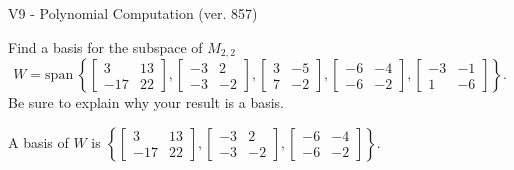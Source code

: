 \begin{exercise}
  \begin{exerciseTitle}V9 - Polynomial Computation (ver. 857)\end{exerciseTitle}
  \begin{exerciseStatement}
    Find a basis for the subspace of \(M_{2,2}\) 
\[W=\mathrm{span}\ \left\{\left[\begin{array}{cc}
3 & 13 \\
-17 & 22
\end{array}\right] , \left[\begin{array}{cc}
-3 & 2 \\
-3 & -2
\end{array}\right] , \left[\begin{array}{cc}
3 & -5 \\
7 & -2
\end{array}\right] , \left[\begin{array}{cc}
-6 & -4 \\
-6 & -2
\end{array}\right] , \left[\begin{array}{cc}
-3 & -1 \\
1 & -6
\end{array}\right]\right\}.\]
 Be sure to explain why your result is a basis.


  \end{exerciseStatement}
  \begin{exerciseAnswer}
   A basis of \(W\) is  \(\left\{\left[\begin{array}{cc}
3 & 13 \\
-17 & 22
\end{array}\right] , \left[\begin{array}{cc}
-3 & 2 \\
-3 & -2
\end{array}\right] , \left[\begin{array}{cc}
-6 & -4 \\
-6 & -2
\end{array}\right]\right\}\).
  


  \end{exerciseAnswer}
\end{exercise}
